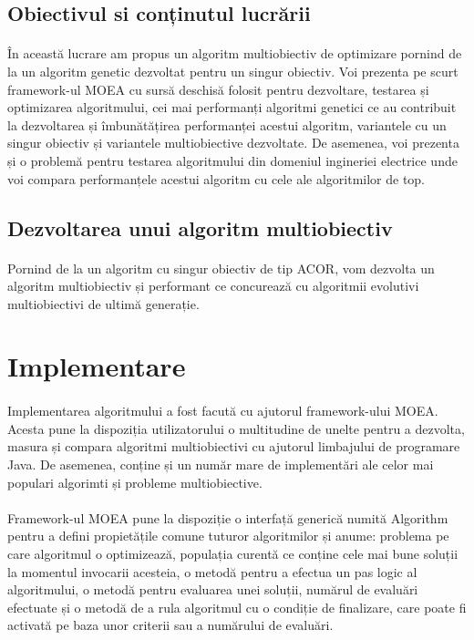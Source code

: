 \documentclass[12pt]{article}
\begin{document}
\subsection{Obiectivul si conținutul lucrării}
\paragraph{}
În această lucrare am propus un algoritm multiobiectiv de optimizare pornind de la un algoritm genetic dezvoltat pentru un singur obiectiv. Voi prezenta pe scurt framework-ul MOEA cu sursă deschisă folosit pentru dezvoltare, testarea și optimizarea algoritmului, cei mai performanți algoritmi genetici ce au contribuit la dezvoltarea și îmbunătățirea performanței acestui algoritm, variantele cu un singur obiectiv și variantele multiobiective dezvoltate. De asemenea, voi prezenta și o problemă pentru testarea algoritmului din domeniul ingineriei electrice unde voi compara performanțele acestui algoritm cu cele ale algoritmilor de top.
\subsection{Dezvoltarea unui algoritm multiobiectiv}
\paragraph{}
Pornind de la un algoritm cu singur obiectiv de tip ACOR, vom dezvolta un algoritm multiobiectiv și performant ce concurează cu algoritmii evolutivi multiobiectivi de ultimă generație.

\section{Implementare}
\paragraph{}
Implementarea algoritmului a fost facută cu ajutorul framework-ului MOEA. Acesta pune la dispoziția utilizatorului o multitudine de unelte pentru a dezvolta, masura și compara algoritmi multiobiectivi cu ajutorul limbajului de programare Java. De asemenea, conține și un număr mare de implementări ale celor mai populari algorimti și probleme multiobiective.
\paragraph{}
Framework-ul MOEA pune la dispoziție o interfață generică numită Algorithm pentru a defini propietățile comune tuturor algoritmilor și anume: problema pe care algoritmul o optimizează, populația curentă ce conține cele mai bune soluții la momentul invocarii acesteia, o metodă pentru a efectua un pas logic al algoritmului, o metodă pentru evaluarea unei soluții, numărul de evaluări efectuate și o metodă de a rula algoritmul cu o condiție de finalizare, care poate fi activată pe baza unor criterii sau a numărului de evaluări.
\end{document}
